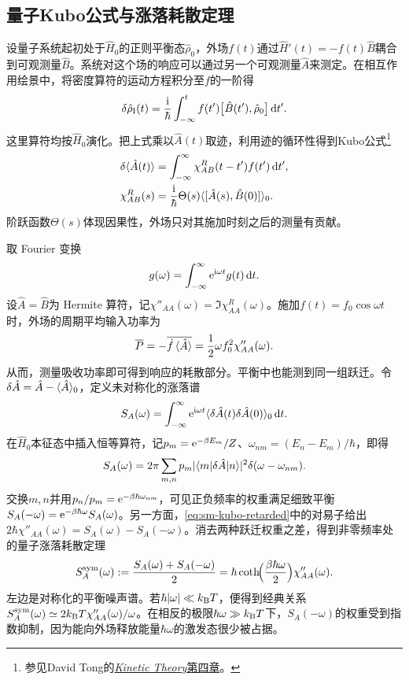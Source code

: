 \subsection{量子Kubo公式与涨落耗散定理}
设量子系统起初处于$\hat H_0$的正则平衡态$\hat\rho_0$，外场$f(t)$通过$\hat H'(t) = -f(t)\hat B$耦合到可观测量$\hat B$。系统对这个场的响应可以通过另一个可观测量$\hat A$来测定。在相互作用绘景中，将密度算符的运动方程积分至$f$的一阶得
\[
	\delta\hat\rho_{\mathrm I}(t) = \frac{\mathrm{i}}{\hbar}\int_{-\infty}^t
	f(t')\bigl[\hat B(t'),\hat\rho_0\bigr]\mathop{}\!\mathrm{d} t'.
\]
这里算符均按$\hat H_0$演化。把上式乘以$\hat A(t)$取迹，利用迹的循环性得到Kubo公式\footnote{参见David Tong的\href{https://davidtong.org/pdfs/teaching/kinetic-theory/kinetic4.pdf}{\textit{Kinetic Theory}第四章}。}
\begin{align}
	\delta\langle\hat A(t)\rangle &= \int_{-\infty}^{\infty}
	\chi^R_{AB}(t - t')f(t')\mathop{}\!\mathrm{d} t',\notag\\
	\chi^R_{AB}(s) &= \frac{\mathrm{i}}{\hbar}\Theta(s)
	\langle[\hat A(s),\hat B(0)]\rangle_0 .
	\label{eq:sm-kubo-retarded}
\end{align}
阶跃函数$\Theta(s)$体现因果性，外场只对其施加时刻之后的测量有贡献。

取 Fourier 变换
\[
	g(\omega) = \int_{-\infty}^{\infty}\mathop{}\!\mathrm{e}^{\mathrm{i}\omega t}g(t)\mathop{}\!\mathrm{d} t.
\]
设$\hat A = \hat B$为 Hermite 算符，记$\chi''_{AA}(\omega) = \Im\chi^R_{AA}(\omega)$。施加$f(t) = f_0\cos\omega t$时，外场的周期平均输入功率为
\begin{equation}
	\label{eq:sm-absorbed-power-response}
	\overline{P} = -\overline{\dot f\,\langle\hat A\rangle}
	= \frac12\omega f_0^2\chi''_{AA}(\omega).
\end{equation}
从而，测量吸收功率即可得到响应的耗散部分。平衡中也能测到同一组跃迁。令$\delta\hat A = \hat A - \langle\hat A\rangle_0$，定义未对称化的涨落谱
\begin{equation}
	\label{eq:sm-fluctuation-spectrum}
	S_A(\omega) = \int_{-\infty}^{\infty}\mathop{}\!\mathrm{e}^{\mathrm{i}\omega t}
	\langle\delta\hat A(t)\delta\hat A(0)\rangle_0\mathop{}\!\mathrm{d} t .
\end{equation}
在$\hat H_0$本征态中插入恒等算符，记$p_m = \mathop{}\!\mathrm{e}^{-\beta E_m}/Z$、$\omega_{nm} = (E_n - E_m)/\hbar$，即得
\begin{equation}
	\label{eq:sm-spectral-representation}
	S_A(\omega) = 2\pi\sum_{m,n}p_m\lvert\langle m\vert\delta\hat A\vert n\rangle\rvert^2
	\delta(\omega - \omega_{nm}).
\end{equation}
交换$m,n$并用$p_n/p_m = \mathop{}\!\mathrm{e}^{-\beta\hbar\omega_{nm}}$，可见正负频率的权重满足细致平衡$S_A(-\omega) = \mathop{}\!\mathrm{e}^{-\beta\hbar\omega}S_A(\omega)$。另一方面，\eqref{eq:sm-kubo-retarded}中的对易子给出$2\hbar\chi''_{AA}(\omega) = S_A(\omega) - S_A(-\omega)$。消去两种跃迁权重之差，得到非零频率处的量子涨落耗散定理
\begin{equation}
	S_A^{\mathrm{sym}}(\omega)
	:= \frac{S_A(\omega) + S_A(-\omega)}2
	= \hbar\coth\!\Bigl(\frac{\beta\hbar\omega}{2}\Bigr)\chi''_{AA}(\omega).
	\label{eq:sm-quantum-fdt}
\end{equation}
左边是对称化的平衡噪声谱。若$\hbar\lvert\omega\rvert \ll k_{\mathrm{B}} T$，便得到经典关系$S_A^{\mathrm{sym}}(\omega) \simeq 2k_{\mathrm{B}} T\chi''_{AA}(\omega)/\omega$。在相反的极限$\hbar\omega \gg k_{\mathrm{B}} T$下，$S_A(-\omega)$的权重受到指数抑制，因为能向外场释放能量$\hbar\omega$的激发态很少被占据。
